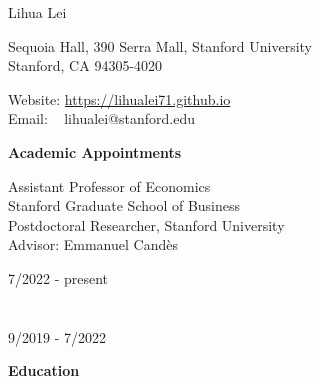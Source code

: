 \documentclass{article}
\begin{document}
\begin{Huge}
\noindent Lihua Lei
\end{Huge}

\vspace{5mm}
\begin{minipage}{0.6\linewidth}
  \flushleft
\noindent Sequoia Hall, 390 Serra Mall, Stanford University \\
\noindent Stanford, CA 94305-4020
\end{minipage}
\hfill
\begin{minipage}{0.4\linewidth}
  Website: \url{https://lihualei71.github.io}\\
  Email: \,\,\,\,\,lihualei@stanford.edu
\end{minipage}

\vspace{5mm}
\begin{large}
\noindent \textbf{Academic Appointments}
\end{large}
\vspace{5mm}

\begin{minipage}{0.65\linewidth}
  \noindent Assistant Professor of Economics \\
  Stanford Graduate School of Business\\
  
\noindent Postdoctoral Researcher, Stanford University\\
Advisor: Emmanuel Cand\`{e}s
\end{minipage}\hfill
\begin{minipage}{0.34\linewidth}
\flushright
\vspace{-3mm}
7/2022 - present\\
~\\
~\\
9/2019 - 7/2022 \\
\end{minipage}

\vspace{5mm}
\begin{large}
\noindent \textbf{Education}
\end{large}
\vspace{5mm}
\end{document}
